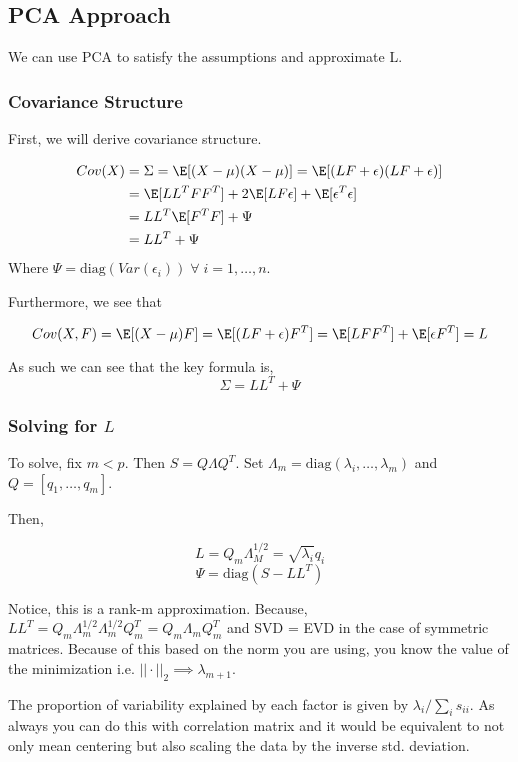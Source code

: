 \documentclass[twoside]{article}
\newcommand\diag[1]{\text{diag}(#1)}
\begin{document}
\subsection{PCA Approach}
We can use PCA to satisfy the assumptions and approximate L.
\subsubsection{Covariance Structure}
First, we will derive covariance structure.

$$\begin{aligned}Cov(X) &= \Sigma = \E[(X-\mu)(X-\mu)] =  \E[(LF + \epsilon)(LF + \epsilon)]
\\& = \E[LL^TFF^T] + 2\E[LF\epsilon] + \E[\epsilon^T\epsilon]
\\& = LL^T\E[F^TF] + \Psi
\\& = LL^T + \Psi
\end{aligned}$$
Where $\Psi = \diag{Var(\epsilon_i)} \; \forall \; i = 1,\dots,n$.

Furthermore, we see that

$$Cov(X,F) = \E[(X-\mu)F] = \E[(LF+\epsilon)F^T] = \E[LFF^T]+\E[\epsilon F^T]=L$$

As such we can see that the key formula is,
\begin{equation}\Sigma = LL^T + \Psi\end{equation}

\subsubsection{Solving for $L$}
To solve, fix $m<p$. Then  $S = Q\Lambda Q^T$. Set $\Lambda_m = \diag{\lambda_i,\dots,\lambda_m}$ and $Q = [q_1,\dots,q_m]$.

Then, 

$$L = Q_m\Lambda_M^{1/2} = \sqrt{\lambda_i}q_i$$
$$\Psi = \diag{S - LL^T}$$

Notice, this is a rank-m approximation. Because, $LL^T = Q_m\Lambda_m^{1/2}\Lambda_m^{1/2}Q_m^T = Q_m\Lambda_mQ_m^T$ and SVD = EVD in the case of symmetric matrices. Because of this based on the norm you are using, you know the value of the minimization i.e. $||\cdot||_2 \implies \lambda_{m+1}$.

The proportion of variability explained by each factor is given by $\lambda_i / \sum_i s_{ii}$. As always you can do this with correlation matrix and it would be equivalent to not only mean centering but also scaling the data by the inverse std. deviation.
\end{document}
